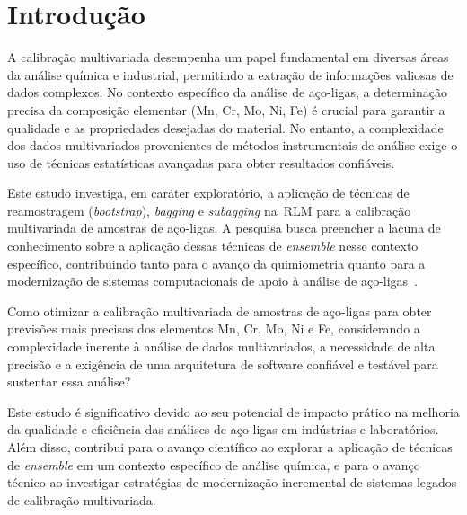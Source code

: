 
\chapter{Introdução}
\label{cha:introducao}
A calibração multivariada desempenha um papel fundamental em diversas áreas da análise
química e industrial, permitindo a extração de informações valiosas de dados complexos.
No contexto específico da análise de aço-ligas, a determinação precisa da composição
elementar (Mn, Cr, Mo, Ni, Fe) é crucial para garantir a qualidade e as propriedades
desejadas do material. No entanto, a complexidade dos dados multivariados provenientes de
métodos instrumentais de análise exige o uso de técnicas estatísticas avançadas para obter
resultados confiáveis.

Este estudo investiga, em caráter exploratório, a aplicação de técnicas de reamostragem
(\textit{bootstrap}), \textit{bagging} e \textit{subagging} na~\gls{RLM} para a calibração
multivariada de amostras de aço-ligas. A pesquisa busca preencher a lacuna de conhecimento
sobre a aplicação dessas técnicas de \textit{ensemble} nesse contexto específico,
contribuindo tanto para o avanço da quimiometria quanto para a modernização de sistemas
computacionais de apoio à análise de aço-ligas~\cite{SKOOG:1997,HARDLE:2007,TIMM:2002}.

Como otimizar a calibração multivariada de amostras de aço-ligas para obter previsões mais
precisas dos elementos Mn, Cr, Mo, Ni e Fe, considerando a complexidade inerente à análise
de dados multivariados, a necessidade de alta precisão e a exigência de uma arquitetura de
software confiável e testável para sustentar essa análise?

Este estudo é significativo devido ao seu potencial de impacto prático na melhoria da
qualidade e eficiência das análises de aço-ligas em indústrias e laboratórios. Além disso,
contribui para o avanço científico ao explorar a aplicação de técnicas de \textit{ensemble}
em um contexto específico de análise química, e para o avanço técnico ao investigar
estratégias de modernização incremental de sistemas legados de calibração multivariada.

